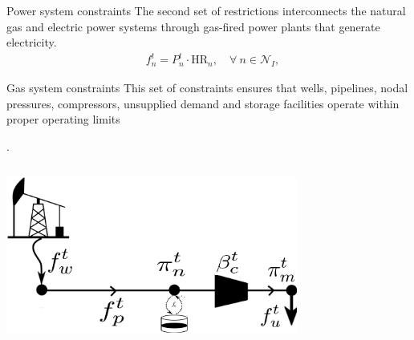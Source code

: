 \documentclass[hyperref={colorlinks,citecolor=blue,linkcolor=blue,urlcolor=blue}]{beamer}
\begin{document}
\begin{frame}{Power system constraints}
\vspace{1em}
The second set of restrictions interconnects the natural gas and electric power systems through gas-fired power plants that generate electricity.
\begin{align}
    &f_{n}^t = P_{n}^t \cdot \text{HR}_n, \quad \forall \ n \in \mathcal{N}_I, \label{eq:gas_power_relation} 
\end{align}
\end{frame}


\begin{frame}{Gas system constraints}
\justifying
\footnotesize
This set of constraints ensures that wells, pipelines, nodal pressures, compressors, unsupplied demand and storage facilities operate within proper operating limits

\cite{MPNG}.

\begin{columns}
\begin{column}{0.5\textwidth}
    \includegraphics[width=0.75\textwidth]{figures/gas_dummy.png}
\end{column}

\begin{column}{0.5\textwidth}
\scriptsize %


\end{column}
\end{columns}
\end{frame}
\end{document}
